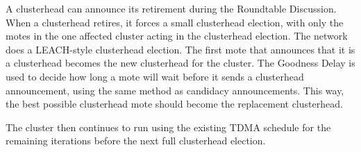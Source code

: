 	A clusterhead can announce its retirement during the Roundtable Discussion. 
	When a clusterhead retires,
	it forces a small clusterhead election, with only the motes in the 
	one affected cluster acting in the clusterhead election. The network
	does a LEACH-style clusterhead election. The first mote that announces
	that it is a clusterhead becomes the new clusterhead for the cluster.
	The Goodness Delay is used to decide how long a mote will wait before
	it sends a clusterhead announcement, using the same method as candidacy announcements.
	This way, the best possible clusterhead mote should become the replacement clusterhead.


	The cluster then continues to run using the existing TDMA schedule
	for the remaining  iterations
	before the next full clusterhead election.



